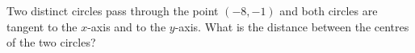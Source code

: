Two distinct circles pass through the point $(-8,-1)$ and both circles are tangent to the $x$-axis and to the $y$-axis. What is the distance between the centres of the two circles?
